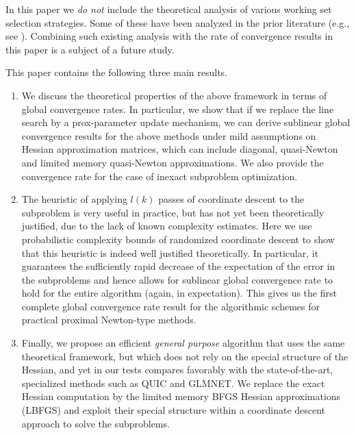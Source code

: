 \documentclass[11pt]{article}
\numberwithin{equation}{section}
\begin{document}
In this paper we {\em do not } include the theoretical analysis of various working set selection strategies. Some of these have been analyzed in the prior literature (e.g., see \cite{LewisWright11}). Combining such existing analysis with the rate of convergence results in this paper is a subject of a future study. 

This paper contains the following  three main results. 
\begin{enumerate}
\item We discuss the  theoretical properties of the above framework in terms of global convergence rates.
In particular, we show that if we replace the line search by a prox-parameter update mechanism, we can derive sublinear global convergence results for the above methods under mild assumptions on Hessian approximation matrices, which can include diagonal, quasi-Newton and limited memory quasi-Newton approximations. We also provide the convergence rate for the case of inexact subproblem optimization. 
\item The heuristic of applying $l(k)$ passes of coordinate descent to the subproblem is very useful in practice, but has not yet been theoretically justified, due to the lack of known complexity estimates. Here we use probabilistic complexity bounds of randomized coordinate descent to show that this heuristic is indeed  well justified theoretically.
In particular, it guarantees the sufficiently rapid decrease of the expectation of the error in the subproblems  and hence allows for sublinear global convergence rate to hold for the entire algorithm (again, in expectation). This gives us the  first complete global convergence rate result for the algorithmic schemes for  practical proximal Newton-type methods. 
\item
Finally, we propose an efficient {\em general purpose} algorithm that uses the same theoretical framework, but  which does not rely on the special structure of the Hessian, and yet in our tests compares favorably with the state-of-the-art, specialized methods such as   QUIC and GLMNET. We replace the exact Hessian computation by the limited memory BFGS Hessian approximations  \cite{NoceWrig06}  (LBFGS) and exploit their special structure within a coordinate descent approach to solve the subproblems.
\end{enumerate}
\end{document}
